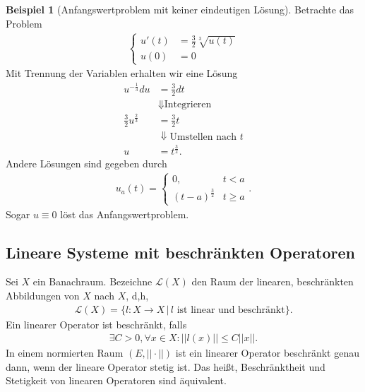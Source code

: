 \documentclass[a4paper]{article}
\theoremstyle{definition}
\newtheorem{example}[theorem]{Beispiel}
\begin{document}
\begin{example}[Anfangswertproblem mit keiner eindeutigen Lösung]
Betrachte das Problem
\begin{align*}
    \begin{cases}
        u'(t) &= \frac{3}{2}\sqrt[3]{u(t)} \\
        u(0) &= 0
    \end{cases}
\end{align*}
Mit Trennung der Variablen erhalten wir eine Lösung
\begin{align*}
    u^{-\frac{1}{3}}du &= \frac{3}{2} dt \\
    &\Downarrow \text{Integrieren}\\
    \frac{3}{2}u^{\frac{2}{3}} &= \frac{3}{2}t \\
    &\Downarrow \text{Umstellen nach $t$}\\
    u &= t^{\frac{3}{2}}.
\end{align*}
Andere Lösungen sind gegeben durch
\begin{align*}
    u_a(t) =
    \begin{cases}
        0, \quad &t < a \\
        (t-a)^{\frac{3}{2}} & t \geq a
    \end{cases}.
\end{align*} 
Sogar $u \equiv 0$ löst das Anfangswertproblem.
\end{example}

\subsection{Lineare Systeme mit beschränkten Operatoren}
Sei $X$ ein Banachraum. Bezeichne $\mathcal{L}(X)$ den Raum der linearen, beschränkten Abbildungen von $X$ nach $X$, d,h, 
\begin{align*}
    \mathcal{L}(X) = \{ l: X \to X \, | \, \text{$l$ ist linear und beschränkt} \}.
\end{align*}
Ein linearer Operator ist beschränkt, falls 
\begin{align*}
    \exists C > 0, \forall x \in X: ||l(x)|| \leq C ||x||.
\end{align*}
In einem normierten Raum $(E, ||\cdot||)$ ist ein linearer Operator beschränkt genau dann, wenn der lineare Operator stetig ist. Das hei\ss t, Beschränktheit und Stetigkeit von linearen Operatoren sind äquivalent.
\end{document}

